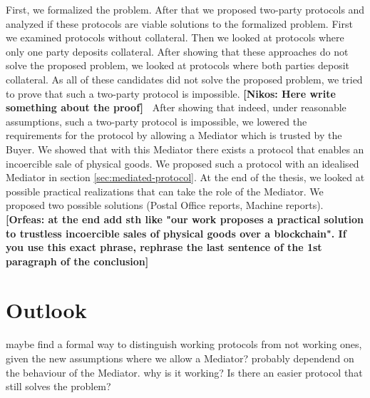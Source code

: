 \documentclass{cacthesis}
\newcommand{\authnote}[3]{{ \footnotesize \textbf{#1[#2: #3]~}}}
\newcommand{\orfnote}[1]{\authnote{\color{blue}}{Orfeas}{#1}}
\newcommand{\niknote}[1]{\authnote{\color{red}}{Nikos}{#1}}
\begin{document}
 First, we formalized the problem. After that we proposed two-party protocols and analyzed if these protocols are viable solutions to the formalized problem. First we examined protocols without collateral. Then we looked at protocols where only one party deposits collateral. After showing that these approaches do not solve the proposed problem, we looked at protocols where both parties deposit collateral. As all of these candidates did not solve the proposed problem, we tried to prove that such a two-party protocol is impossible. \niknote{Here write something about the proof} After showing that indeed, under reasonable assumptions, such a two-party protocol is impossible, we lowered the requirements for the protocol by allowing a Mediator which is trusted by the Buyer. We showed that with this Mediator there exists a protocol that enables an incoercible sale of physical goods. We proposed such a protocol with an idealised Mediator in section \ref{sec:mediated-protocol}. At the end of the thesis, we looked at possible practical realizations that can take the role of the Mediator. We proposed two possible solutions (Postal Office reports, Machine reports). \orfnote{ at the end add sth like "our work proposes a practical solution to trustless incoercible sales of physical goods over a blockchain". If you use this exact phrase, rephrase the last sentence of the 1st paragraph of the conclusion}



\section{Outlook}
maybe find a formal way to distinguish working protocols from not working ones, given the new assumptions where we allow a Mediator? probably dependend on the behaviour of the Mediator. why is it working? Is there an easier protocol that still solves the problem?\newline
\end{document}
